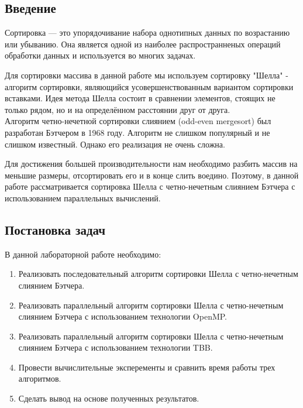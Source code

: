 \documentclass{report}
\begin{document}
\setcounter{page}{2}
\tableofcontents{}
\clearpage

\begin{center}
\section*{Введение}
\end{center}
\par Сортировка — это упорядочивание набора однотипных данных по возрастанию или убыванию. Она является одной из наиболее распространненых операций обработки данных и используется во многих задачах. 
\par Для сортировки массива в данной работе мы используем сортировку "Шелла" - алгоритм сортировки, являющийся усовершенствованным вариантом сортировки вставками. Идея метода Шелла состоит в сравнении элементов, стоящих не только рядом, но и на определённом расстоянии друг от друга. \\
Алгоритм четно-нечетной сортировки слиянием (odd-even mergesort) был разработан Бэтчером в 1968 году. Алгоритм не слишком популярный и не слишком известный. Однако его реализация не очень сложна.
\par Для достижения большей производительности нам необходимо разбить массив на меньшие размеры, отсортировать его и в конце слить воедино. Поэтому, в данной работе рассматривается сортировка Шелла с четно-нечетным слиянием Бэтчера с использованием параллельных вычислений.
\newpage

\begin{center}
\section*{Постановка задач}
\end{center}
В данной лабораторной работе необходимо:
\begin{enumerate}
\item Реализовать последовательный алгоритм сортировки Шелла с четно-нечетным слиянием Бэтчера.
\item Реализовать параллельный алгоритм сортировки Шелла с четно-нечетным слиянием Бэтчера с использованием технологии OpenMP.
\item Реализовать параллельный алгоритм сортировки Шелла с четно-нечетным слиянием Бэтчера с использованием технологии TBB.
\item Провести вычислительные эксперементы и сравнить время работы трех алгоритмов.
\item Сделать вывод на основе полученных результатов.
\end{enumerate}
\newpage
\end{document}
